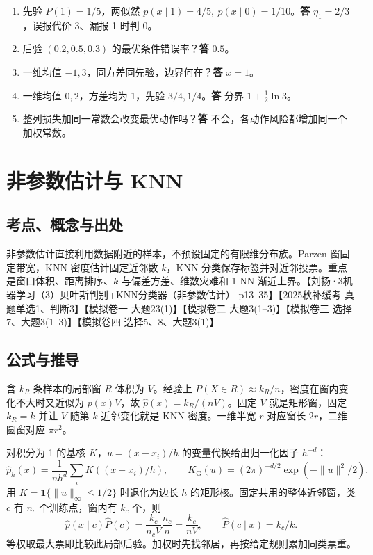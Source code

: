 \documentclass[UTF8,a4paper,zihao=-4,fontset=fandol]{ctexart}
\begin{document}
\begin{enumerate}[nosep]
\item 先验 \(P(1)=1/5\)，两似然 \(p(x\mid1)=4/5,\ p(x\mid0)=1/10\)。\textbf{答} \(\eta_1=2/3\)，误报代价 3、漏报 1 时判 0。
\item 后验 \((0.2,0.5,0.3)\) 的最优条件错误率？\textbf{答} \(0.5\)。
\item 一维均值 \(-1,3\)，同方差同先验，边界何在？\textbf{答} \(x=1\)。
\item 一维均值 \(0,2\)，方差均为 1，先验 \(3/4,1/4\)。\textbf{答} 分界 \(1+\tfrac12\ln3\)。
\item 整列损失加同一常数会改变最优动作吗？\textbf{答} 不会，各动作风险都增加同一个加权常数。
\end{enumerate}

\section{非参数估计与 KNN}
\label{ch:prml-knn}

\subsection{考点、概念与出处}
非参数估计直接利用数据附近的样本，不预设固定的有限维分布族。Parzen 窗固定带宽，KNN 密度估计固定近邻数 \(k\)，KNN 分类保存标签并对近邻投票。重点是窗口体积、距离排序、\(k\) 与偏差方差、维数灾难和 1-NN 渐近上界。【刘扬·3机器学习（3）贝叶斯判别+KNN分类器（非参数估计） p13–35】【2025秋补缓考 真题单选1、判断3】【模拟卷一 大题23(1)】【模拟卷二 大题3(1–3)】【模拟卷三 选择7、大题3(1–3)】【模拟卷四 选择5、8、大题3(1)】

\subsection{公式与推导}
含 \(k_R\) 条样本的局部窗 \(R\) 体积为 \(V\)。经验上 \(P(X\in R)\approx k_R/n\)，密度在窗内变化不大时又近似为 \(p(x)V\)，故 \(\hat p(x)=k_R/(nV)\)。固定 \(V\) 就是矩形窗，固定 \(k_R=k\) 并让 \(V\) 随第 \(k\) 近邻变化就是 KNN 密度。一维半宽 \(r\) 对应窗长 \(2r\)，二维圆窗对应 \(\pi r^2\)。

对积分为 1 的基核 \(K\)，\(u=(x-x_i)/h\) 的变量代换给出归一化因子 \(h^{-d}\)：
\[
 \widehat p_h(x)=\frac1{nh^d}\sum_i K((x-x_i)/h),\qquad
 K_{\mathrm G}(u)=(2\pi)^{-d/2}\exp(-\|u\|^2/2).
\]
用 \(K=\mathbf1\{\|u\|_\infty\le1/2\}\) 时退化为边长 \(h\) 的矩形核。固定共用的整体近邻窗，类 \(c\) 有 \(n_c\) 个训练点，窗内有 \(k_c\) 个，则
\[
 \hat p(x\mid c)\hat P(c)=\frac{k_c}{n_cV}\frac{n_c}{n}
 =\frac{k_c}{nV},\qquad \hat P(c\mid x)=k_c/k.
\]
等权取最大票即比较此局部后验。加权时先找邻居，再按给定规则累加同类票重。
\end{document}
